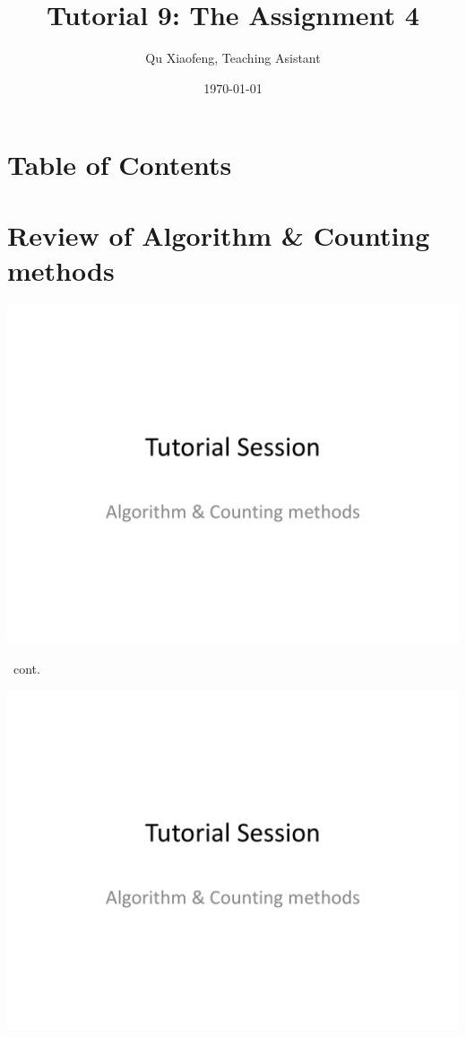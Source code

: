 \documentclass[handout]{beamer}
\title[Tutorial 9]{Tutorial 9: The Assignment 4}
\author[COMP210]{Qu Xiaofeng\texorpdfstring{, Teaching Asistant}{}}
\institute{COMP210\\Discrete Structure}
\date{\today}
\begin{document}
\frame{\titlepage}

\section*{Table of Contents}
    \begin{frame}{\secname}
        \tableofcontents
    \end{frame}

\section[Review]{Review of Algorithm \& Counting methods}
    \begin{frame}[c,shrink]{\secname}
        \label{}
        \centerline{\includegraphics[height=0.85\textheight,page=2]{algo_counting}}
    \end{frame}
    \begin{frame}[c,shrink]{\secname\ cont.}
        \centerline{\includegraphics[height=0.85\textheight,page=3]{algo_counting}}
    \end{frame}
\end{document}
